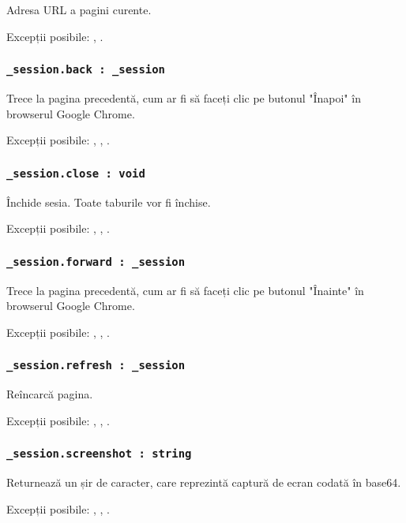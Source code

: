 Adresa URL a pagini curente.

Excepții posibile: , .

\subsubsection{\lstinline|_session.back : _session|}

Trece la pagina precedentă, cum ar fi să faceți clic pe butonul "Înapoi" în browserul Google Chrome.

Excepții posibile: , , .

\subsubsection{\lstinline|_session.close : void|}

Închide sesia. Toate taburile vor fi închise.

Excepții posibile: , , .

\subsubsection{\lstinline|_session.forward : _session|}

Trece la pagina precedentă, cum ar fi să faceți clic pe butonul "Înainte" în browserul Google Chrome.

Excepții posibile: , , .

\subsubsection{\lstinline|_session.refresh : _session|}

Reîncarcă pagina.

Excepții posibile: , , .

\subsubsection{\lstinline|_session.screenshot : string|}

Returnează un șir de caracter, care reprezintă captură de ecran codată în base64.

Excepții posibile: , , .

